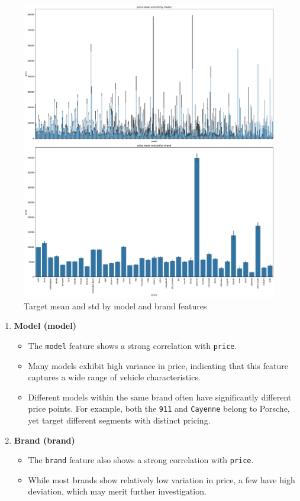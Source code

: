 \documentclass[conference]{IEEEtran}
\begin{document}
\begin{figure}[H]
\centering
\includegraphics[trim=0 0 10cm 0, clip,width=\linewidth]{figures/model_brand_barplot.pdf}
\caption{Target mean and std by model and brand features}
\label{fig:model_brand_barplot}
\end{figure}

\begin{enumerate}
    \item \textbf{Model (model)}
    \begin{itemize}
        \item The \texttt{model} feature shows a strong correlation with
                \texttt{price}.
        \item Many models exhibit high variance in price, indicating that this
                feature captures a wide range of vehicle characteristics.
        \item Different models within the same brand often have significantly
                different price points. For example, both the \texttt{911} and
                \texttt{Cayenne} belong to Porsche, yet target different
                segments with distinct pricing.
    \end{itemize}

    \item \textbf{Brand (brand)}
    \begin{itemize}
        \item The \texttt{brand} feature also shows a strong correlation with
                \texttt{price}.
        \item While most brands show relatively low variation in price, a few
                have high deviation, which may merit further investigation.
    \end{itemize}
\end{enumerate}
\end{document}

